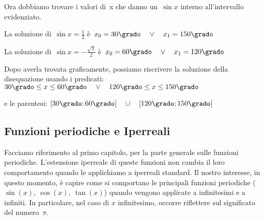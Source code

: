 \begin{esempio}
  Ora dobbiamo trovare i valori di~x che danno un~$\sin x$ interno 
  all'intervallo evidenziato.
  
  La soluzione di~$\sin x = \frac{1}{2}$ \quad
  è~\quad $x_0 = 30 \grado \quad \vee \quad x_1 = 150 \grado$
  
  La soluzione di~$\sin x = -\frac{\sqrt{3}}{2}$ \quad
  è~\quad $x_0 = 60 \grado \quad \vee \quad x_1 = 120 \grado$
  
 \vspace{-6pt}
  \begin{center}
\begin{inaccessibleblock}
    
\end{inaccessibleblock}
  \end{center}

Dopo averla trovata graficamente, possiamo riscrivere la soluzione della 
disequazione usando i predicati:\quad 
$30\grado \le x \le 60\grado \quad \vee \quad 
 120\grado \le x \le 150\grado$

e le parentesi:\quad 
$\left[30\grado ; 60\grado \right] \quad \cup \quad
 \left[120\grado ; 150\grado \right]$
  
 \end{esempio}

\subsection{Funzioni periodiche e Iperreali}
\label{subsubsec:insnum_periodiche}
Facciamo riferimento al primo capitolo, per la parte generale 
sulle funzioni periodiche. L'estensione iperreale di queste funzioni
non cambia il loro comportamento quando le applichiamo a iperreali standard.
Il nostro interesse, in questo momento, è capire come si comportano
le principali funzioni periodiche ($\sin(x),\ \cos(x),\ \tan(x)$)
quando vengono applicate a infinitesimi e a infiniti. In particolare,
nel caso di $x$ infinitesimo, occorre riflettere sul significato del
numero~$\pi$.

